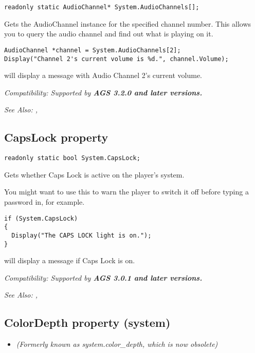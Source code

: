 \begin{verbatim}
readonly static AudioChannel* System.AudioChannels[];
\end{verbatim}
Gets the AudioChannel instance for the specified channel number. This allows you
to query the audio channel and find out what is playing on it.

\begin{verbatim}
AudioChannel *channel = System.AudioChannels[2];
Display("Channel 2's current volume is %d.", channel.Volume);
\end{verbatim}
will display a message with Audio Channel 2's current volume.

\it{Compatibility:} Supported by \bf{AGS 3.2.0} and later versions.

\it{See Also:} ,


\subsection{CapsLock property}\label{System.CapsLock}%

\begin{verbatim}
readonly static bool System.CapsLock;
\end{verbatim}
Gets whether Caps Lock is active on the player's system.

You might want to use this to warn the player to switch it off before typing
a password in, for example.

\begin{verbatim}
if (System.CapsLock)
{
  Display("The CAPS LOCK light is on.");
}
\end{verbatim}
will display a message if Caps Lock is on.

\it{Compatibility:} Supported by \bf{AGS 3.0.1} and later versions.

\it{See Also:} ,


\subsection{ColorDepth property (system)}\label{System.ColorDepth}%

\begin{itemize}
\item \it{(Formerly known as system.color_depth, which is now obsolete)}
\end{itemize}

